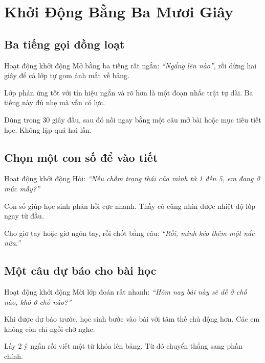 \chapter{Khởi Động Bằng Ba Mươi Giây}

\section{Ba tiếng gọi đồng loạt}
\begin{khoidongbox}{Hoạt động khởi động}
Mở bằng ba tiếng rất ngắn: \textit{``Ngẩng lên nào''}, rồi dừng hai giây để cả lớp tự gom ánh mắt về bảng.
\end{khoidongbox}
\begin{visaohieuqua}
Lớp phản ứng tốt với tín hiệu ngắn và rõ hơn là một đoạn nhắc trật tự dài. Ba tiếng này đủ nhẹ mà vẫn có lực.
\end{visaohieuqua}
\begin{cachlam5phut}
Dùng trong 30 giây đầu, sau đó nối ngay bằng một câu mở bài hoặc mục tiêu tiết học. Không lặp quá hai lần.
\end{cachlam5phut}
\ngancach

\section{Chọn một con số để vào tiết}
\begin{khoidongbox}{Hoạt động khởi động}
Hỏi: \textit{``Nếu chấm trạng thái của mình từ 1 đến 5, em đang ở mức mấy?''}
\end{khoidongbox}
\begin{visaohieuqua}
Con số giúp học sinh phản hồi cực nhanh. Thầy cô cũng nhìn được nhiệt độ lớp ngay từ đầu.
\end{visaohieuqua}
\begin{cachlam5phut}
Cho giơ tay hoặc giơ ngón tay, rồi chốt bằng câu: \textit{``Rồi, mình kéo thêm một nấc nữa.''}
\end{cachlam5phut}
\ngancach

\section{Một câu dự báo cho bài học}
\begin{khoidongbox}{Hoạt động khởi động}
Mời lớp đoán rất nhanh: \textit{``Hôm nay bài này sẽ dễ ở chỗ nào, khó ở chỗ nào?''}
\end{khoidongbox}
\begin{visaohieuqua}
Khi được dự báo trước, học sinh bước vào bài với tâm thế chủ động hơn. Các em không còn chỉ ngồi chờ nghe.
\end{visaohieuqua}
\begin{cachlam5phut}
Lấy 2 ý ngắn rồi viết một từ khóa lên bảng. Từ đó chuyển thẳng sang phần chính.
\end{cachlam5phut}
\ngancach

